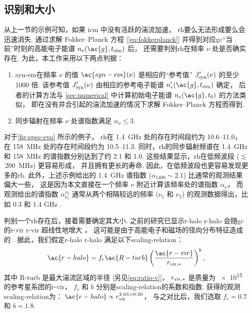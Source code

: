 \subsection{识别和大小}
\label{sec:halo-size}

从上一节的示例可知，如果 \ac{icm} 中没有活跃的湍流加速，
\ac{rh}要么无法形成要么会迅速消失.
通过求解 Fokker--Planck 方程 [\autoref{eq:fokkerplanck}]
并得到对应\ac{gc}\enquote{当前}时刻的高能电子能谱 $n_e(\ac{g}, t_{\R{sim}})$ 后，
还需要判别\ac{rh}在频率 $\nu$ 处是否确实存在.
为此，本工作采用以下两点判据：
\begin{enumerate}
  \item \acl{syn-em}在频率 $\nu$ 的值 $\ac{syn-em}(\nu)$
    是相应的\enquote{参考值} $J'_{\mathrm{syn}}(\nu)$ 的至少 1000 倍.
    该参考值 $J'_{\mathrm{syn}}(\nu)$ 由相应的参考电子能谱
    $n'_e(\ac{g}, t_{\R{sim}})$ 确定，
    后者的计算方法与 \autoref{sec:numerical} 中计算初始电子能谱
    $n_e(\ac{g}, t_0)$ 的方法类似，
    即在没有并合引起的湍流加速的情况下求解 Fokker--Planck 方程而得到.

  \item 同步辐射在频率 $\nu$ 处谱指数满足 $\alpha_{\nu} \le 3$.
\end{enumerate}

对于\autoref{fig:spec-evo} 所示的例子，
\ac{rh}在 \SI{1.4}{\GHz} 处的存在时间段约为 \SIrange{10.6}{11.0}{\Gyr}，
在 \SI{158}{\MHz} 处的存在时间段约为 \SIrange{10.5}{11.3}{\Gyr}.
同时，\ac{rh}的同步辐射频谱在 \SI{1.4}{\GHz} 和 \SI{158}{\MHz}
的谱指数分别达到了约 2.1 和 1.0.
这些结果显示，\ac{rh}在低频波段 ($\lesssim$\,\SI{200}{\MHz}) 更容易形成，
并且拥有更长的寿命.
因此，在低频波段也更容易发现更多的\ac{rh}.
此外，上述示例给出的 \SI{1.4}{\GHz} 谱指数 ($\alpha_{1400} \sim 2.1$)
比通常的观测结果\cite{feretti2012}偏大一些，
这是因为本文直接在一个频率 $\nu$ 附近计算该频率处的谱指数 $\alpha_{\nu}$，
而观测给出的谱指数 $\alpha_{\nu_1}^{\nu_2}$ 通常从两个相隔较远的频率
($\nu_1$ 和 $\nu_2$) 的观测数据得出，比如 0.3 和 1.4 GHz \cite{feretti2012}.

判别一个\ac{rh}存在后，接着需要确定其大小.
之前的研究已显示\acl{r-halo} \ac{r-halo}
会随\ac{gc}的\acl{r-vir} \ac{r-vir} 超线性地增大 \cite{cassano2007,basu2012}，
这可能是由于高能电子和磁场的径向分布特征造成的 \cite{dolag2002}.
据此，我们假定\acl{r-halo} \ac{r-halo} 满足以下\ac{scaling-relation}：
\begin{equation}
  \label{eq:r-halo}
  \ac{r-halo} = f_r \ac{R-turb}
    \left( \frac{\ac{r-vir}}{r_{\R{vir,*}}} \right)^b ,
\end{equation}
其中
\ac{R-turb} 是最大湍流区域的半径 [另见\autoref{eq:ratio-v}]，
$r_{\mathrm{vir,*}}$ 是质量为 \SI{e15}{\solarmass} 的参考星系团的\acl{r-vir}，
$f_r$ 和 $b$ 分别是\ac{scaling-relation}的系数和指数.
 获得的观测\ac{scaling-relation}为：
$\ac{r-halo} \propto r_{\R{vir}}^{2.63 \pm 0.50}$，
与之对比后，我们选取 $f_r = 0.7$ 和 $b = 1.8$.

